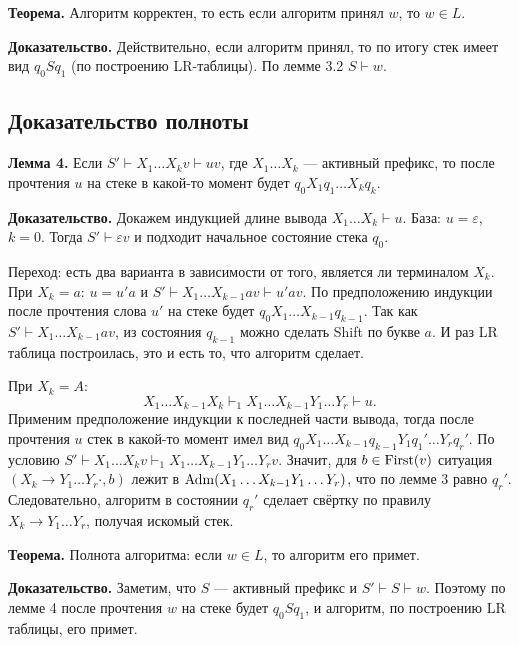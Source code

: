 \QED

\textbf{Теорема.} Алгоритм корректен, то есть если алгоритм принял $w$, то $w \in L$.

\textbf{Доказательство.} Действительно, если алгоритм принял, то по итогу стек имеет вид $q_0 S q_1$ (по построению LR-таблицы).
По лемме 3.2 $S \vdash w$.
\QED

\subsection{Доказательство полноты}

\textbf{Лемма 4.} Если $S' \vdash X_1 \dots X_kv \vdash uv$, где $X_1 \dots X_k$ --- активный префикс, то после прочтения $u$ на стеке в какой-то момент будет $q_0X_1q_1 \dots X_kq_k$.

\textbf{Доказательство.} Докажем индукцией длине вывода $X_1 \dots X_k \vdash u$.
База: $u = \varepsilon$, $k = 0$.
Тогда $S' \vdash \varepsilon v$ и подходит начальное состояние стека $q_0$.

Переход: есть два варианта в зависимости от того, является ли терминалом $X_k$.
При $X_k = a$: $u = u'a$ и $S' \vdash X_1 \dots X_{k-1} av \vdash u'av$.
По предположению индукции после прочтения слова $u'$ на стеке будет $q_0X_1 \dots X_{k-1}q_{k-1}$.
Так как $S' \vdash X_1 \dots X_{k-1} av$, из состояния $q_{k-1}$ можно сделать Shift по букве $a$.
И раз LR таблица построилась, это и есть то, что алгоритм сделает.

При $X_k = A$:
\[
    X_1 \dots X_{k-1} X_k \vdash_1 X_1 \dots X_{k-1} Y_1 \dots Y_r \vdash u.
\]
Применим предположение индукции к последней части вывода, тогда после прочтения $u$ стек в какой-то момент имел вид $q_0 X_1 \dots X_{k-1} q_{k-1} Y_1 q_1' \dots Y_r q_r'$.
По условию $S' \vdash X_1 \dots X_k v \vdash_1 X_1 \dots X_{k-1} Y_1 \dots Y_r v$.
Значит, для $b \in \operatorname{First}(v)$ ситуация $(X_k \to Y_1 \dots Y_r \cdot, b)$ лежит в $\operatorname{Adm}(X_1 \dots X_{k-1} Y_1 \dots Y_r)$, что по лемме 3 равно $q_r'$.
Следовательно, алгоритм в состоянии $q_r'$ сделает свёртку по правилу $X_k \to Y_1 \dots Y_r$, получая искомый стек.

\QED

\textbf{Теорема.} Полнота алгоритма: если $w \in L$, то алгоритм его примет.

\textbf{Доказательство.} Заметим, что $S$ --- активный префикс и $S' \vdash S \vdash w$.
Поэтому по лемме 4 после прочтения $w$ на стеке будет $q_0 S q_1$, и алгоритм, по построению LR таблицы, его примет.

